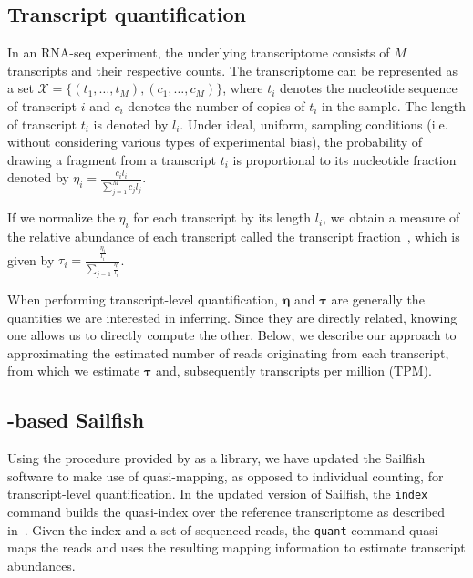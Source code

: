 \subsection{Transcript quantification}

In an RNA-seq experiment, the underlying transcriptome consists of $M$ transcripts and their respective counts. The transcriptome can be represented as a set $\mathcal{X} = \{(t_1,\ldots,t_M),(c_1,\ldots,c_M)\}$, where $t_i$ denotes the nucleotide sequence of transcript $i$ and $c_i$ denotes the number of copies of $t_i$ in the sample. The length of transcript $t_i$ is denoted by $l_i$. Under ideal, uniform, sampling conditions (i.e. without considering various types of experimental bias), the probability of drawing a fragment from a transcript $t_i$ is proportional to its nucleotide fraction~\citep{li2010rna} denoted by $\eta_i = \frac{c_i l_i }{\sum_{j=1}^M c_j l_j}$.

If we normalize the $\eta_i$ for each transcript by its length $l_i$, we obtain a measure of the relative abundance of each transcript called the transcript fraction~\citep{li2010rna}, which is given by $\tau_i = \frac{\frac{\eta_i}{l_i}}{\sum_{j=1} \frac{\eta_i}{l_i}}$.

When performing transcript-level quantification, $\bm{\eta}$ and $\bm{\tau}$ are generally the quantities we are interested in inferring.  Since they are directly related, knowing one allows us to directly compute the other.  Below, we describe our approach to approximating the estimated number of reads originating from each transcript, from which we estimate $\bm{\tau}$ and, subsequently transcripts per million (TPM).

\subsection{\Qm-based Sailfish}

Using the \qm procedure provided by \rapmap as a library, we have updated the Sailfish \citep{sailfish} software to make use of quasi-mapping, as opposed to individual \kmer counting, for transcript-level quantification. In the updated version of Sailfish, the \texttt{index} command builds the quasi-index over the reference transcriptome as described in~. Given the index and a set of sequenced reads, the \texttt{quant} command quasi-maps the reads and uses the resulting mapping information to estimate transcript abundances.


